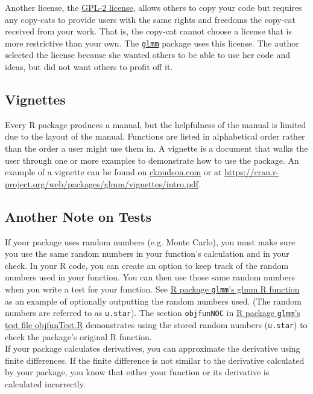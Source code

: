 \documentclass{article}
\begin{document}
Another license, the \href{https://cran.r-project.org/web/licenses/GPL-2}{GPL-2 license}, allows others to copy your code but requires any copy-cats to provide users with the same rights and freedoms the copy-cat received from your  work. That  is, the copy-cat cannot choose a license that is more restrictive than your own. The \href{https://cran.r-project.org/web/packages/glmm/index.html}{\texttt{glmm}} package uses this license. The author selected the license because she wanted others to be able to use her code and ideas, but did not want others to profit off it.  


\subsection{Vignettes}
Every R package produces a manual, but the helpfulness of the manual is limited due to the layout of the manual. Functions are listed in alphabetical order rather than the order a user might use them in. A vignette is a document that walks the user through one or more examples to demonstrate how to use the package. An example of a vignette can be found on \href{cknudson.com}{\url{cknudson.com}} or at  \href{https://cran.r-project.org/web/packages/glmm/vignettes/intro.pdf}{\url{https://cran.r-project.org/web/packages/glmm/vignettes/intro.pdf}}.

\subsection{Another Note on Tests}
If your package uses random numbers (e.g. Monte Carlo), you must make sure you use the same random numbers in your function's calculation and in your check. In your R code, you can create an option to  keep track of the random numbers used in your function. You can then use those same random numbers when you write a test for your function. See \href{https://github.com/knudson1/glmm/blob/master2/glmm/R/glmm.R}{R package \texttt{glmm}'s glmm.R function} as an example of optionally outputting the random numbers used. (The random numbers are referred to as \texttt{u.star}). The section \texttt{objfunNOC} in \href{https://github.com/knudson1/glmm/blob/master2/glmm/tests/objfunTest.R}{R package \texttt{glmm}'s test file objfunTest.R} demonstrates  using the stored random numbers (\texttt{u.star}) to check the package's original R function.\\

If your package calculates derivatives, you can approximate the derivative using finite differences. If the finite difference is not similar to the derivative calculated by your package, you know that either your function or its derivative is calculated incorrectly.  \\
\end{document}
